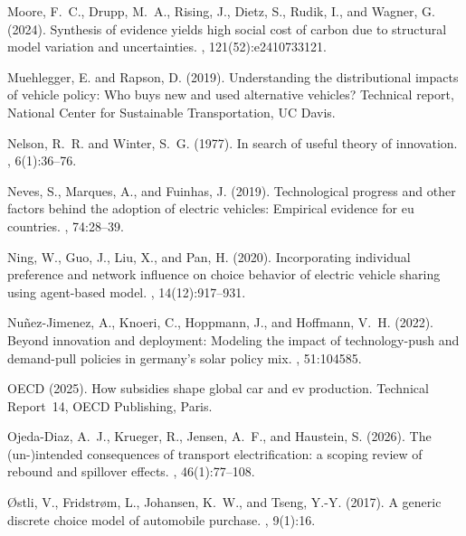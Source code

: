 \documentclass[12pt]{article}
\begin{document}
\begin{thebibliography}{}
Moore, F.~C., Drupp, M.~A., Rising, J., Dietz, S., Rudik, I., and Wagner, G.
  (2024).
\newblock Synthesis of evidence yields high social cost of carbon due to
  structural model variation and uncertainties.
,
  121(52):e2410733121.

Muehlegger, E. and Rapson, D. (2019).
\newblock Understanding the distributional impacts of vehicle policy: Who buys
  new and used alternative vehicles?
\newblock Technical report, National Center for Sustainable Transportation, UC
  Davis.

Nelson, R.~R. and Winter, S.~G. (1977).
\newblock In search of useful theory of innovation.
, 6(1):36--76.

Neves, S., Marques, A., and Fuinhas, J. (2019).
\newblock Technological progress and other factors behind the adoption of
  electric vehicles: Empirical evidence for eu countries.
, 74:28--39.

Ning, W., Guo, J., Liu, X., and Pan, H. (2020).
\newblock Incorporating individual preference and network influence on choice
  behavior of electric vehicle sharing using agent-based model.
,
  14(12):917--931.

Nuñez-Jimenez, A., Knoeri, C., Hoppmann, J., and Hoffmann, V.~H. (2022).
\newblock Beyond innovation and deployment: Modeling the impact of
  technology-push and demand-pull policies in germany's solar policy mix.
, 51:104585.

{OECD} (2025).
\newblock How subsidies shape global car and ev production.
\newblock Technical Report~14, OECD Publishing, Paris.

Ojeda-Diaz, A.~J., Krueger, R., Jensen, A.~F., and Haustein, S. (2026).
\newblock The (un-)intended consequences of transport electrification: a
  scoping review of rebound and spillover effects.
, 46(1):77--108.

{\O}stli, V., Fridstr{\o}m, L., Johansen, K.~W., and Tseng, Y.-Y. (2017).
\newblock A generic discrete choice model of automobile purchase.
, 9(1):16.


\end{thebibliography}
\end{document}
